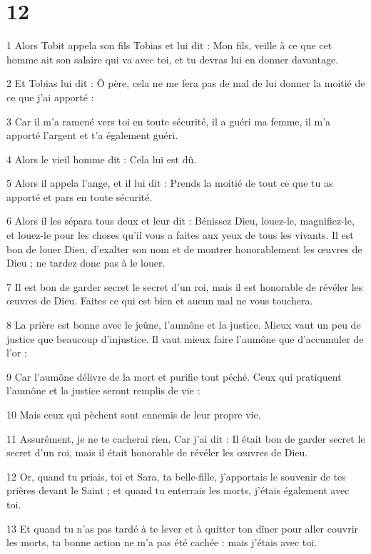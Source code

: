 \chapter{12}

\par 1 Alors Tobit appela son fils Tobias et lui dit : Mon fils, veille à ce que cet homme ait son salaire qui va avec toi, et tu devras lui en donner davantage.
\par 2 Et Tobias lui dit : Ô père, cela ne me fera pas de mal de lui donner la moitié de ce que j'ai apporté :
\par 3 Car il m'a ramené vers toi en toute sécurité, il a guéri ma femme, il m'a apporté l'argent et t'a également guéri.
\par 4 Alors le vieil homme dit : Cela lui est dû.
\par 5 Alors il appela l'ange, et il lui dit : Prends la moitié de tout ce que tu as apporté et pars en toute sécurité.
\par 6 Alors il les sépara tous deux et leur dit : Bénissez Dieu, louez-le, magnifiez-le, et louez-le pour les choses qu'il vous a faites aux yeux de tous les vivants. Il est bon de louer Dieu, d'exalter son nom et de montrer honorablement les œuvres de Dieu ; ne tardez donc pas à le louer.
\par 7 Il est bon de garder secret le secret d'un roi, mais il est honorable de révéler les œuvres de Dieu. Faites ce qui est bien et aucun mal ne vous touchera.
\par 8 La prière est bonne avec le jeûne, l'aumône et la justice. Mieux vaut un peu de justice que beaucoup d’injustice. Il vaut mieux faire l'aumône que d'accumuler de l'or :
\par 9 Car l'aumône délivre de la mort et purifie tout péché. Ceux qui pratiquent l’aumône et la justice seront remplis de vie :
\par 10 Mais ceux qui pèchent sont ennemis de leur propre vie.
\par 11 Assurément, je ne te cacherai rien. Car j'ai dit : Il était bon de garder secret le secret d'un roi, mais il était honorable de révéler les œuvres de Dieu.
\par 12 Or, quand tu priais, toi et Sara, ta belle-fille, j'apportais le souvenir de tes prières devant le Saint ; et quand tu enterrais les morts, j'étais également avec toi.
\par 13 Et quand tu n'as pas tardé à te lever et à quitter ton dîner pour aller couvrir les morts, ta bonne action ne m'a pas été cachée : mais j'étais avec toi.
